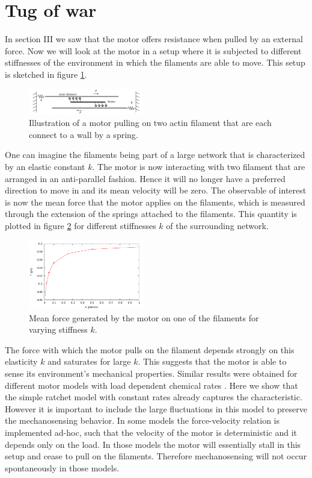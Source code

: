 \documentclass[aps,pre,twocolumn,showpacs,showkeys,a4paper]{revtex4}
\begin{document}
\section{Tug of war}
In  section III we saw that the motor offers resistance when pulled by an external force. 
Now we will look at the motor in a setup where it is subjected to different stiffnesses of the environment in which the filaments are able to move. 
This setup is sketched in figure \ref{Fig: tug}. 
\begin{figure}[t]
\centering
\includegraphics[width=0.45\textwidth,height=!]{tug}
\caption{Illustration of a motor pulling on two actin filament that are each connect to a wall by a spring.}
\label{Fig: tug}
\end{figure}
One can imagine the filaments being part of a large network that is characterized by an elastic constant $k$. 
The motor is now interacting with two filament that are arranged in an anti-parallel fashion. 
Hence it will no longer have a preferred direction to move in and its mean velocity will be zero. 
The observable of interest is now the mean force that the motor applies on the filaments, which is measured through the extension of the springs attached to the filaments. 
This quantity is plotted in figure \ref{Fig: tug_k} for different stiffnesses $k$ of the surrounding network.
\begin{figure}[t]
\centering
\includegraphics[width=0.45\textwidth,height=!]{tug_k}
\caption{Mean force generated by the motor on one of the filaments for varying stiffness $k$.}
\label{Fig: tug_k}
\end{figure}
The force with which the motor pulls on the filament depends strongly on this elasticity $k$ and saturates for large $k$. 
This suggests that the motor is able to sense its environment's mechanical properties.
Similar results were obtained for different motor models with load dependent chemical rates \cite{stam2015isoforms,albert2014stochastic}.
Here we show that the simple ratchet model with constant rates already captures the characteristic. However it is important to include the large fluctuations in this model to preserve the mechanosensing behavior. In some models the force-velocity relation is implemented ad-hoc, such that the velocity of the motor is deterministic and it depends only on the load. In those models the motor will essentially stall in this setup and 
cease to pull on the filaments. Therefore mechanosensing will not occur spontaneously in those models.
\end{document}
